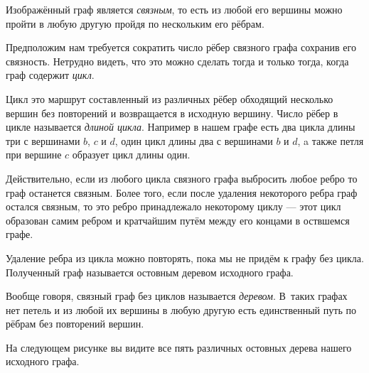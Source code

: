 \documentclass{article}
\begin{document}
Изображённый граф является \emph{связным}, то есть из любой его вершины можно пройти в любую другую пройдя по нескольким его рёбрам.

Предположим нам требуется сократить число рёбер связного графа сохранив его связность.
Нетрудно видеть, что это можно сделать тогда и только тогда, когда граф содержит \emph{цикл}.

Цикл это маршрут составленный из различных рёбер обходящий несколько вершин без повторений 
и возвращается в исходную вершину. 
Число рёбер в цикле называется \emph{длиной цикла}.
Например в нашем графе есть два цикла  длины три с вершинами $b$, $c$ и $d$, 
один цикл длины два с вершинами $b$ и $d$,
a также петля при вершине $c$ образует цикл длины один.

Действительно, если из любого цикла связного графа выбросить любое ребро то граф останется связным.
Более того, если после удаления некоторого ребра граф остался связным, то это ребро принадлежало некоторому циклу --- этот цикл образован самим ребром и кратчайшим путём между его концами в оствшемся графе.

Удаление ребра из цикла можно повторять, пока мы не придём к графу без цикла.
Полученный граф называется остовным деревом исходного графа.

Вообще говоря, связный граф без циклов называется \emph{деревом}.
В~таких графах нет петель и из любой их вершины в любую другую есть единственный путь по рёбрам без повторений вершин.

На следующем рисунке вы видите все пять различных остовных дерева нашего исходного графа.
\end{document}
